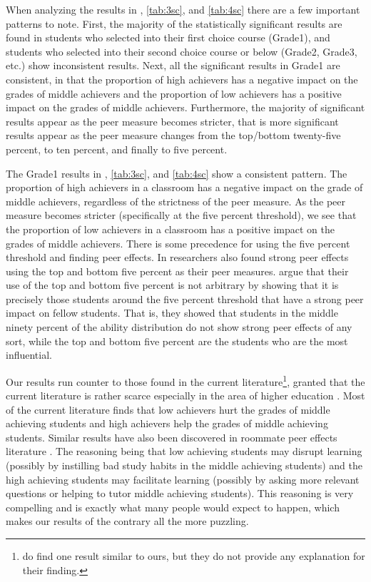 \clearpage{}

When analyzing the results in , \ref{tab:3sc}, and \ref{tab:4sc} there are a few important patterns to note. 
First, the majority of the statistically significant results are found in students who selected into their first choice course (Grade1), and students who selected into their second choice course or below (Grade2, Grade3, etc.) show inconsistent results. 
Next, all the significant results in Grade1 are consistent, in that the proportion of high achievers has a negative impact on the grades of middle achievers and the proportion of low achievers has a positive impact on the grades of middle achievers. 
Furthermore, the majority of significant results appear as the peer measure becomes stricter, that is more significant results appear as the peer measure changes from the top/bottom twenty-five percent, to ten percent, and finally to five percent. 
 
The Grade1 results in , \ref{tab:3sc}, and \ref{tab:4sc} show a consistent pattern. 
The proportion of high achievers in a classroom has a negative impact on the grade of middle achievers, regardless of the strictness of the peer measure. 
As the peer measure becomes stricter (specifically at the five percent threshold), we see that the proportion of low achievers in a classroom has a positive impact on the grades of middle achievers. 
There is some precedence for using the five percent threshold and finding peer effects. 
In \citet{lavy2012good} researchers also found strong peer effects using the top and bottom five percent as their peer measures. 
\citet{lavy2012good} argue that their use of the top and bottom five percent is not arbitrary by showing that it is precisely those students around the five percent threshold that have a strong peer impact on fellow students. 
That is, they showed that students in the middle ninety percent of the ability distribution do not show strong peer effects of any sort, while the top and bottom five percent are the students who are the most influential. 

Our results run counter to those found in the current literature\footnote{\citet{burke2013classroom} do find one result similar to ours, but they do not provide any explanation for their finding.}, granted that the current literature is rather scarce especially in the area of higher education \citep{kang2007classroom,carman2012classroom,burke2013classroom,schlosser2008inside,lavy2012good}. 
Most of the current literature finds that low achievers hurt the grades of middle achieving students and high achievers help the grades of middle achieving students. 
Similar results have also been discovered in roommate peer effects literature \citep{griffith2014peer,zimmerman2003peer,sacerdote2000peer}.
The reasoning being that low achieving students may disrupt learning (possibly by instilling bad study habits in the middle achieving students) and the high achieving students may facilitate learning (possibly by asking more relevant questions or helping to tutor middle achieving students). 
This reasoning is very compelling and is exactly what many people would expect to happen, which makes our results of the contrary all the more puzzling.  

